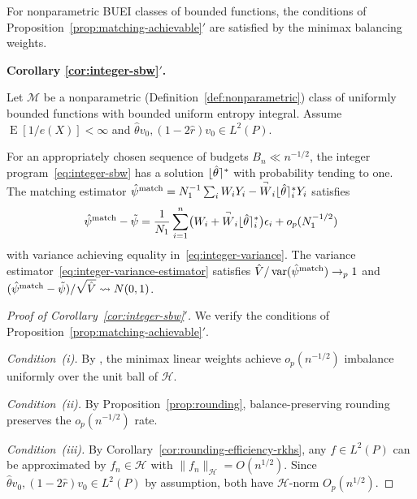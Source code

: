 \documentclass{article}
\newcommand{\paragraph}[1]{\par\noindent\textit{#1}\enspace}
\newenvironment{corollaryprime}[1]{%
  \par\medskip\noindent\textbf{Corollary #1$'$.}\itshape\space
}{%
  \par\medskip
}
\theoremstyle{definition}
\DeclareMathOperator{\E}{E}
\newcommand{\calH}{\ensuremath{\mathcal{H}}}
\DeclareMathOperator{\Var}{var}
\DeclarePairedDelimiter\round{\lfloor}{\rceil}
\newcommand{\model}{\mathcal{M}}
\newcommand{\<}{\langle}
\renewcommand{\>}{\rangle}
\begin{document}
\begin{refsection}
For nonparametric BUEI classes of bounded functions, the conditions of Proposition~\ref{prop:matching-achievable}$'$ are satisfied by the minimax balancing weights.

\begin{corollaryprime}{\ref{cor:integer-sbw}}
Let $\model$ be a nonparametric (Definition~\ref{def:nonparametric}) class of uniformly bounded functions with bounded uniform entropy integral. Assume $\E[1/e(X)] < \infty$ and $\hat\theta v_0, (1{-}2\hat r)v_0 \in L^2(P)$.

For an appropriately chosen sequence of budgets $B_n \ll n^{-1/2}$, the integer program~\eqref{eq:integer-sbw} has a solution $\round{\hat\theta}^*$ with probability tending to one. The matching estimator $\hat\psi^{\textup{match}} = N_1^{-1}\sum_i W_i Y_i - \overset{\neg}{W}_i \round{\hat\theta}^*_i Y_i$ satisfies
\[
\hat\psi^{\textup{match}} - \tilde\psi = \frac{1}{N_1}\sum_{i=1}^n\bigl(W_i + \overset{\neg}{W}_i\round{\hat\theta}^*_i\bigr)\epsilon_i + o_p(N_1^{-1/2})
\]
with variance achieving equality in~\eqref{eq:integer-variance}. The variance estimator~\eqref{eq:integer-variance-estimator} satisfies $\hat V / \Var(\hat\psi^{\textup{match}}) \to_p 1$ and $(\hat\psi^{\textup{match}} - \tilde\psi)/\sqrt{\hat V} \rightsquigarrow N(0,1)$.
\end{corollaryprime}

\begin{proof}[Proof of Corollary~\ref{cor:integer-sbw}$'$]
We verify the conditions of Proposition~\ref{prop:matching-achievable}$'$.

\paragraph{Condition~(i).}
By \citet[Theorem 2]{hirshberg2019minimax}, the minimax linear weights achieve $o_p(n^{-1/2})$ imbalance uniformly over the unit ball of $\calH$.

\paragraph{Condition~(ii).}
By Proposition~\ref{prop:rounding}, balance-preserving rounding preserves the $o_p(n^{-1/2})$ rate.

\paragraph{Condition~(iii).}
By Corollary~\ref{cor:rounding-efficiency-rkhs}, any $f \in L^2(P)$ can be approximated by $f_n \in \calH$ with $\|f_n\|_\calH = O(n^{1/2})$. Since $\hat\theta v_0, (1{-}2\hat r)v_0 \in L^2(P)$ by assumption, both have $\calH$-norm $O_p(n^{1/2})$.


\end{proof}
\end{refsection}
\end{document}
